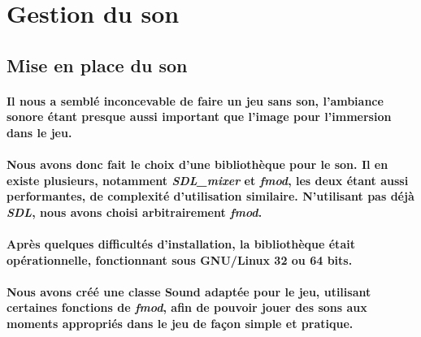 \newpage
\section{Gestion du son}
\subsection{Mise en place du son}
\paragraph{Il nous a semblé inconcevable de faire un jeu sans son, l’ambiance sonore étant presque aussi important que l’image pour l’immersion dans le jeu.}

\paragraph{Nous avons donc fait le choix d’une bibliothèque pour le son. Il en existe plusieurs, notamment \textit{SDL\_mixer} et \textit{fmod}, les deux étant aussi performantes, de complexité d’utilisation similaire. N’utilisant pas déjà \textit{SDL}, nous avons choisi arbitrairement \textit{fmod}.}

\paragraph{Après quelques difficultés d’installation, la bibliothèque était opérationnelle, fonctionnant sous GNU/Linux 32 ou 64 bits.}

\paragraph{Nous avons créé une classe \textbf{Sound} adaptée pour le jeu, utilisant certaines fonctions de \textit{fmod}, afin de pouvoir jouer des sons aux moments appropriés dans le jeu de façon simple et pratique.}

